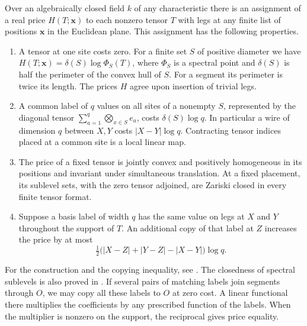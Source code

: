 \begin{theorem}\label{geo:spectrum}
Over an algebraically closed field $k$ of any characteristic there is an
assignment of a real price $H(T;\mathbf x)$ to each nonzero tensor $T$
with legs at any finite list of positions $\mathbf x$ in the Euclidean
plane. This assignment has the following properties.
\begin{enumerate}
\item A tensor at one site costs zero. For a finite set $S$ of positive
diameter we have $H(T;\mathbf x)=\delta(S)\log\Phi_S(T)$, where $\Phi_S$ is a
spectral point and $\delta(S)$ is half the perimeter of the convex hull
of $S$. For a segment its perimeter is twice its length. The prices
$H$ agree upon insertion of trivial legs.
\item A common label of $q$ values on all sites of a nonempty $S$, represented by
the diagonal tensor $\sum_{a=1}^q\bigotimes_{x\in S}e_a$, costs
$\delta(S)\log q$. In particular a wire of dimension $q$ between $X,Y$
costs $|X-Y|\log q$. Contracting tensor indices placed at a common
site is a local linear map.
\item The price of a fixed tensor is jointly convex and positively
homogeneous in its positions and invariant under simultaneous
translation. At a fixed placement, its sublevel sets, with the zero
tensor adjoined, are Zariski closed in every finite tensor format.
\item Suppose a basis label of width $q$ has the same value on legs at
$X$ and $Y$ throughout the support of $T$. An additional copy of that
label at $Z$ increases the price by at most
\begin{equation}\label{geo:copy}
 \tfrac12\bigl(|X-Z|+|Y-Z|-|X-Y|\bigr)\log q.
\end{equation}
\end{enumerate}
\end{theorem}

For the construction and the copying inequality, see \cite[Theorem~, Section~ and Propositions~ and~]{oaG}. The closedness of spectral sublevels is also proved in \cite{SpectralSublevels}. 
If several pairs of matching labels join
segments through $O$, we may copy all these labels to $O$ at zero
cost. A linear functional there multiplies the coefficients by any
prescribed function of the labels. When the multiplier is nonzero on
the support, the reciprocal gives price equality.

